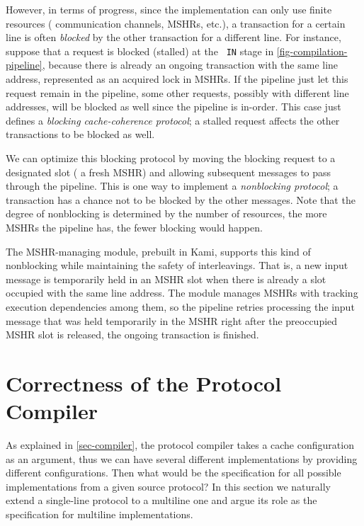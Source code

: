 However, in terms of progress, since the implementation can only use finite resources (\eg{} communication channels, MSHRs, etc.), a transaction for a certain line is often \emph{blocked} by the other transaction for a different line.
For instance, suppose that a request is blocked (stalled) at the {\small\tt\color{myblue} IN} stage in \autoref{fig-compilation-pipeline}, because there is already an ongoing transaction with the same line address, represented as an acquired lock in MSHRs.
If the pipeline just let this request remain in the pipeline, some other requests, possibly with different line addresses, will be blocked as well since the pipeline is in-order.
This case just defines a \emph{blocking cache-coherence protocol}; a stalled request affects the other transactions to be blocked as well.

We can optimize this blocking protocol by moving the blocking request to a designated slot (\eg{} a fresh MSHR) and allowing subsequent messages to pass through the pipeline.
This is one way to implement a \emph{nonblocking protocol}; a transaction has a chance not to be blocked by the other messages.
Note that the degree of nonblocking is determined by the number of resources, \eg{} the more MSHRs the pipeline has, the fewer blocking would happen.

The MSHR-managing module, prebuilt in Kami, supports this kind of nonblocking while maintaining the safety of interleavings.
That is, a new input message is temporarily held in an MSHR slot when there is already a slot occupied with the same line address.
The module manages MSHRs with tracking execution dependencies among them, so the pipeline retries processing the input message that was held temporarily in the MSHR right after the preoccupied MSHR slot is released, \ie{} the ongoing transaction is finished.

\section{Correctness of the Protocol Compiler}
\label{sec-compiler-correctness}

As explained in \autoref{sec-compiler}, the protocol compiler takes a cache configuration as an argument, thus we can have several different implementations by providing different configurations.
Then what would be the specification for all possible implementations from a given source protocol?
In this section we naturally extend a single-line \hemiola{} protocol to a multiline one and argue its role as the specification for multiline implementations.


